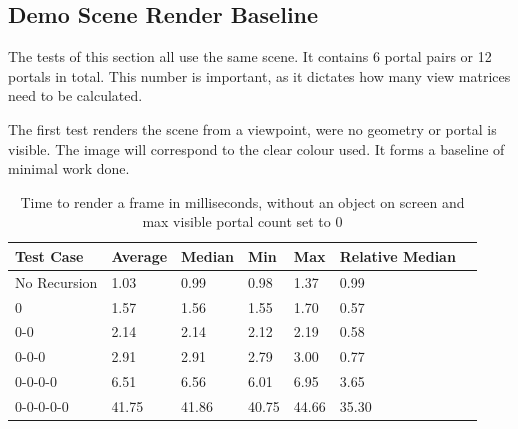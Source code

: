 \subsection{Demo Scene Render Baseline}
The tests of this section all use the same scene. It contains 6 portal pairs or 12 portals in total. This number is important, as it dictates how many view matrices need to be calculated.

The first test renders the scene from a viewpoint, were no geometry or portal is visible. The image will correspond to the clear colour used. It forms a baseline of minimal work done.

\begin{table}[H]
	\centering
	\begin{tabular}{|l|l|l|l|l|l|l|}
		\hline
		Test Case    & Average & Median & Min   & Max   & Relative Median \\ \hline
		No Recursion & 1.03    & 0.99   & 0.98  & 1.37  & 0.99            \\ \hline
		0            & 1.57    & 1.56   & 1.55  & 1.70  & 0.57            \\ \hline
		0-0          & 2.14    & 2.14   & 2.12  & 2.19  & 0.58            \\ \hline
		0-0-0        & 2.91    & 2.91   & 2.79  & 3.00  & 0.77            \\ \hline
		0-0-0-0      & 6.51    & 6.56   & 6.01  & 6.95  & 3.65            \\ \hline
		0-0-0-0-0    & 41.75   & 41.86  & 40.75 & 44.66 & 35.30           \\ \hline        
	\end{tabular}
	\caption{Time to render a frame in milliseconds, without an object on screen and max visible portal count set to 0}
	\label{tab:baseline}
\end{table}

